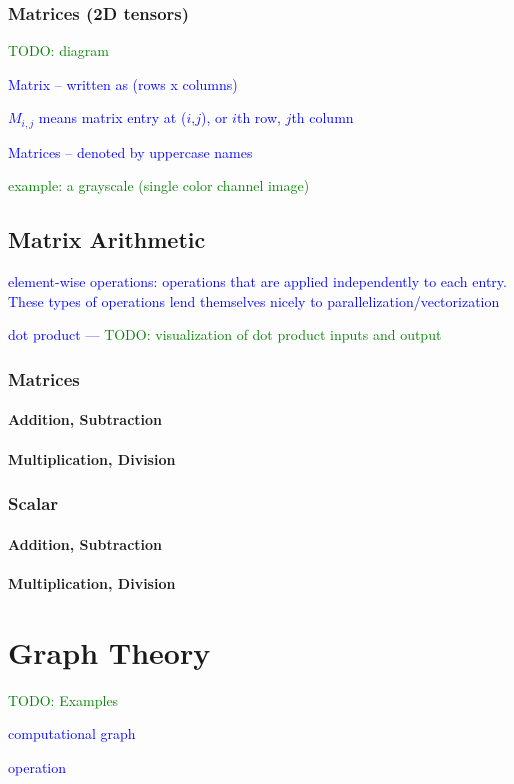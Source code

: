 \subsubsection{Matrices (2D tensors)}

\textcolor{green}{TODO: diagram}

\textcolor{blue}{Matrix -- written as (rows x columns)}

\textcolor{blue}{$M_{i,j}$ means matrix entry at ($i$,$j$), or $i$th row, $j$th column}


\textcolor{blue}{Matrices -- denoted by uppercase names}

\textcolor{green}{example: a grayscale (single color channel image)}



\subsection{Matrix Arithmetic}

\textcolor{blue}{{element-wise} operations: operations that are applied independently to each entry. These types of operations lend themselves nicely to parallelization/vectorization}

\textcolor{blue}{dot product --- \textcolor{green}{TODO: visualization of dot product inputs and output}}

\subsubsection{Matrices}

\paragraph{Addition, Subtraction}

\paragraph{Multiplication, Division}

\subsubsection{Scalar}

\paragraph{Addition, Subtraction}

\paragraph{Multiplication, Division}



\section{Graph Theory}

\textcolor{green}{TODO: Examples}

\textcolor{blue}{computational graph}

\textcolor{blue}{operation}

